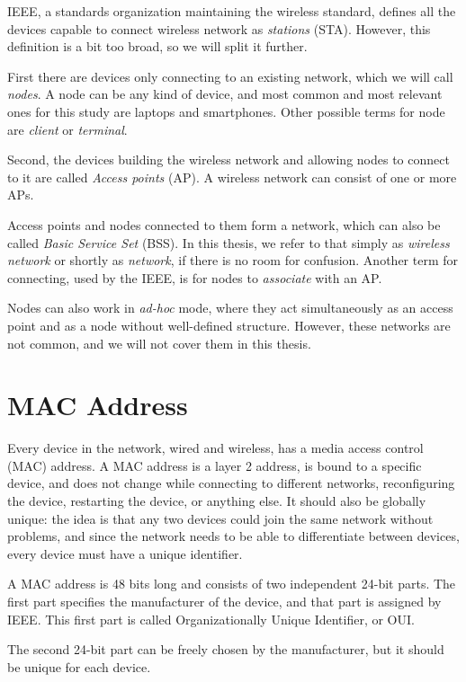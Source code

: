 \documentclass[12pt,a4paper,oneside,pdftex]{report}
\begin{document}
IEEE, a standards organization maintaining the wireless standard, defines all the devices capable to connect wireless network as \emph{stations} (STA). However, this definition is a bit too broad, so we will split it further.

First there are devices only connecting to an existing network, which we will call \emph{nodes}. A node can be any kind of device, and most common and most relevant ones for this study are laptops and smartphones. Other possible terms for node are \emph{client} or \emph{terminal}.

Second, the devices building the wireless network and allowing nodes to connect to it are called \emph{Access points} (AP). A wireless network can consist of one or more APs.

Access points and nodes connected to them form a network, which can also be called \emph{Basic Service Set} (BSS). In this thesis, we refer to that simply as \emph{wireless network} or shortly as \emph{network}, if there is no room for confusion. Another term for connecting, used by the IEEE, is for nodes to \emph{associate} with an AP.

Nodes can also work in \emph{ad-hoc} mode, where they act simultaneously as an access point and as a node without well-defined structure. However, these networks are not common, and we will not cover them in this thesis.


\section{MAC Address}
\label{sec:MAC}

Every device in the network, wired and wireless, has a media access control (MAC) address. A MAC address is a layer 2 address, is bound to a specific device, and does not change while connecting to different networks, reconfiguring the device, restarting the device, or anything else. It should also be globally unique: the idea is that any two devices could join the same network without problems, and since the network needs to be able to differentiate between devices, every device must have a unique identifier.~\cite{802_overview}

A MAC address is 48 bits long and consists of two independent 24-bit parts. The first part specifies the manufacturer of the device, and that part is assigned by IEEE. This first part is called Organizationally Unique Identifier, or OUI.

The second 24-bit part can be freely chosen by the manufacturer, but it should be unique for each device. 
\end{document}
